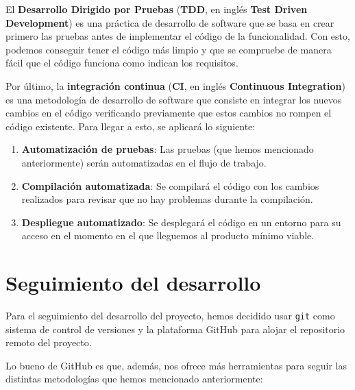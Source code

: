 El \textbf{Desarrollo Dirigido por Pruebas} (\textbf{TDD}, en inglés \textbf{Test 
Driven Development}) \cite{tdd} es una práctica de desarrollo de software que se 
basa en crear primero las pruebas antes de implementar el código de la 
funcionalidad. Con esto, podemos conseguir tener el código más limpio y que se 
compruebe de manera fácil que el código funciona como indican los requisitos.

Por último, la \textbf{integración continua} (\textbf{CI}, en inglés 
\textbf{Continuous Integration}) \cite{ci} es una metodología de desarrollo de 
software que consiste en integrar los nuevos cambios en el código verificando 
previamente que estos cambios no rompen el código existente. Para llegar a esto, se 
aplicará lo siguiente:

\begin{enumerate}
    \item \textbf{Automatización de pruebas}: Las pruebas (que hemos mencionado 
    anteriormente) serán automatizadas en el flujo de trabajo.
    \item \textbf{Compilación automatizada}: Se compilará el código con los cambios 
    realizados para revisar que no hay problemas durante la compilación.
    \item \textbf{Despliegue automatizado}: Se desplegará el código en un entorno 
    para su acceso en el momento en el que lleguemos al producto mínimo viable.
\end{enumerate}

\section{Seguimiento del desarrollo}

Para el seguimiento del desarrollo del proyecto, hemos decidido usar \verb|git| 
como sistema de control de versiones y la plataforma GitHub para alojar el 
repositorio remoto del proyecto.

Lo bueno de GitHub es que, además, nos ofrece más herramientas para seguir las 
distintas metodologías que hemos mencionado anteriormente:

